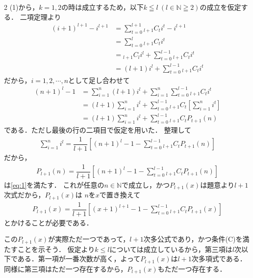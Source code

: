 \documentclass[../../main.tex]{subfiles}
\begin{document}
\begin{multicols}{2}
  (1)から，$k=1,2$の時は成立するため，以下$k \leqq l \ (l \in \mathbb{N} \geqq 2)$の成立を仮定する．
  二項定理より
  \begin{align}
    (i+1)^{l+1} - i^{l+1}
    & = \sum_{t=0}^{l+1} {}_{l+1}C_{t} i^t - i^{l+1}           \\
    & = \sum_{t=0}^{l} {}_{l+1}C_{t} i^t                       \\
    & = {}_{l+1}C_l i^{l} + \sum_{t=0}^{l-1} {}_{l+1}C_{t} i^t \\
    & = (l+1)i^{l} + \sum_{t=0}^{l-1} {}_{l+1}C_{t} i^t
  \end{align}
  だから，$i=1,2,\cdots, n$として足し合わせて
  \begin{align}
    (n+1)^{l} - 1
    & = \sum_{i=1}^{n} (l+1)i^{l}  + \sum_{i=1}^{n} \sum_{t=0}^{l-1} {}_{l+1}C_{t} i^t               \\
    & = (l+1) \sum_{i=1}^{n} i^{l} + \sum_{t=0}^{l-1} {}_{l+1}C_{t} \left[\sum_{i=1}^{n} i^t \right] \\
    & = (l+1) \sum_{i=1}^{n} i^{l} + \sum_{t=0}^{l-1} {}_{l+1}C_{t} P_{t+1}(n)
  \end{align}
  である．ただし最後の行の二項目で仮定を用いた．
  整理して
  \begin{align}
    \sum_{i=1}^{n} i^{l} = \dfrac{1}{l+1} \left[(n+1)^{l} - 1 - \sum_{t=0}^{l-1} {}_{l+1}C_{t} P_{t+1}(n)\right]
  \end{align}
  だから，
  \begin{align}
    P_{l+1}(n) = \dfrac{1}{l+1} \left[(n+1)^{l} - 1 - \sum_{t=0}^{l-1} {}_{l+1}C_{t} P_{t+1}(n)\right]
  \end{align}
  は\cref{eq:1}を満たす．
  これが任意の$n \in \mathbb{N}$で成立し，かつ$P_{l+1}(x)$は題意より$l+1$次式だから，$P_{l+1}(x)$は
  $n$を$x$で置き換えて
  \begin{align}
    P_{l+1}(x) = \dfrac{1}{l+1} \left[ (x+1)^{l+1} - 1 - \sum_{t=0}^{l-1} {}_{l+1}C_{t} P_{t+1}(x) \right] \label{eq:2}
  \end{align}
  とかけることが必要である．

  この$P_{l+1}(x)$が実際ただ一つであって，$l+1$次多公式であり，かつ条件(C)を満たすことを示そう．
  仮定より$k \le l$については成立しているから，第三項は$l$次以下である．第一項が一番次数が高く，よって$P_{l+1}(x)$は$l+1$次多項式である．
  同様に第三項はただ一つ存在するから，$P_{l+1}(x)$もただ一つ存在する．


\end{multicols}
\end{document}
